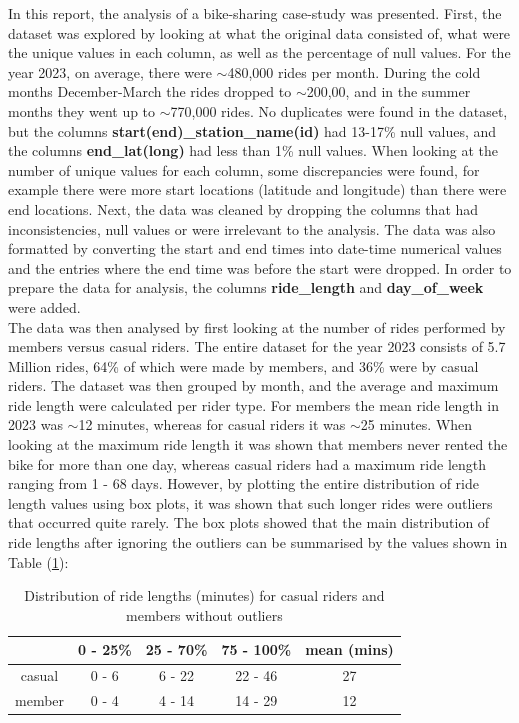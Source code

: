 \documentclass[12pt]{article}
\begin{document}
In this report, the analysis of a bike-sharing case-study was presented. First, the dataset was explored by looking at   what the original data consisted of, what were the unique values in each column, as well as the percentage of null values. For the year 2023, on average, there were $\sim$480,000 rides per month. During the cold months December-March the rides dropped to $\sim$200,00, and in the summer months they went up to $\sim$770,000 rides. No duplicates were found in the dataset, but the columns \textbf{start(end)\_station\_name(id)} had 13-17\% null values, and the columns \textbf{end\_lat(long)} had less than 1\% null values. When looking at the number of unique values for each column, some discrepancies were found, for example there were more start locations (latitude and longitude) than there were end locations. Next, the data was cleaned by dropping the columns that had inconsistencies, null values or were irrelevant to the analysis. The data was also formatted by converting the start and end times into date-time numerical values and the entries where the end time was before the start were dropped. In order to prepare the data for analysis, the columns \textbf{ride\_length} and \textbf{day\_of\_week} were added. \\

The data was then analysed by first looking at the number of rides performed by members versus casual riders. The entire dataset for the year 2023 consists of 5.7 Million rides, 64\% of which were made by members, and 36\% were by casual riders. The dataset was then grouped by month, and the average and maximum ride length were calculated per rider type. For members the mean ride length in 2023 was $\sim$12 minutes, whereas for casual riders it was $\sim$25 minutes. When looking at the maximum ride length it was shown that members never rented the bike for more than one day, whereas casual riders had a maximum ride length ranging from 1 - 68 days. However, by plotting the entire distribution of ride length values using box plots, it was shown that such longer rides were outliers that occurred quite rarely. The box plots showed that the main distribution of ride lengths after ignoring the outliers can be summarised by the values shown in Table (\underline{\ref{table1}}): \\

\begin{table}[h]
\begin{center}
\begin{tabular}{ | c | c | c| c | c |  } 
\hline
   	& 0 - 25\% 	& 25 - 70\% 	& 75 - 100\% &  mean (mins)  \\ 
  \hline
casual 	& 0 - 6 		&  6 - 22 		& 22 - 46 & 27 \\
\hline
member 	& 0 - 4 		& 4 - 14		& 14 - 29 & 12 \\
\hline
\end{tabular}
\caption{Distribution of ride lengths (minutes) for casual riders and members without outliers}
\label{table1}
\end{center} 
\end{table}
\end{document}
